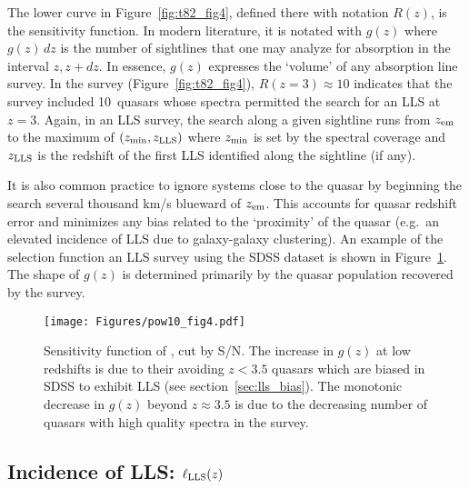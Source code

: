 \documentclass[graybox]{svmult}
\begin{document}
The lower curve in Figure~\ref{fig:t82_fig4}, defined there with
notation $R(z)$, is the sensitivity function.  In modern literature,
it is notated with $g(z)$ where
$g(z) \, dz$ is the number of sightlines that one may
analyze for absorption in the interval $z, z+dz$.
In essence,  $g(z)$ expresses the `volume'
of any absorption line survey.  In the \cite{tytler82} survey
(Figure~\ref{fig:t82_fig4}), $R(z=3) \approx 10$ indicates
that the survey included 10~quasars whose spectra permitted
the search for an LLS at $z=3$.
Again, in an LLS survey, the search along a given sightline
runs from  $z_{\rm em}$ to the 
maximum of $(z_{\rm min}, z_{\rm LLS})$ where
$z_{\rm min}$ is set by the spectral coverage and
$z_{\rm LLS}$ is the redshift of the first LLS identified
along the sightline (if any).

It is also common practice to ignore systems close to the quasar
by beginning the search several thousand
km/s blueward of $z_{\rm em}$.  This 
accounts for quasar redshift error and
minimizes any bias related to the `proximity' of the quasar
(e.g.\ an elevated incidence of LLS due to galaxy-galaxy
clustering).
An example of the selection function an LLS survey using 
the SDSS dataset \cite[]{pow10}
is shown in Figure~\ref{fig:pow_fig4}.
The shape of $g(z)$ is determined primarily by the
quasar population recovered by the survey.

%
\begin{figure}[b]
\sidecaption
\texttt{[image: Figures/pow10\_fig4.pdf]}
%
%
\caption{Sensitivity function of \cite{pow10}, cut by
S/N.
The increase in $g(z)$ at low redshifts is due to
their avoiding $z<3.5$ quasars which are biased
in SDSS to exhibit LLS (see section~\ref{sec:lls_bias}).
The monotonic decrease in $g(z)$ beyond $z \approx 3.5$
is due to the decreasing number of quasars with high
quality spectra in the survey.
}
\label{fig:pow_fig4}       %
\end{figure}



\subsection{Incidence of LLS: $\ell_{\rm LLS}(z)$}
\label{sec:lls_incidence}
\end{document}
